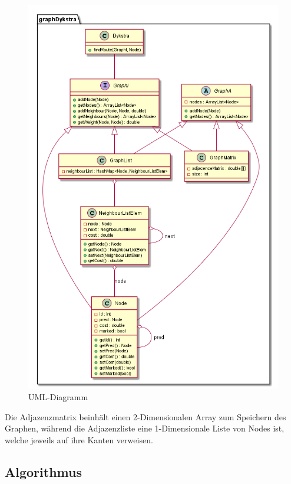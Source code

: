 \documentclass[11pt]{scrartcl}
\begin{document}
\begin{figure}
\includegraphics[width=\linewidth]{A9.png}
\caption{UML-Diagramm}
\label{figure:uml}
\end{figure}

		Die Adjazenzmatrix beinhält einen 2-Dimensionalen Array zum Speichern des Graphen, während die Adjazenzliste eine 1-Dimensionale Liste von Nodes ist, welche jeweils auf ihre Kanten verweisen.

	\subsection{Algorithmus}
		\label{sec:algo}
\end{document}
